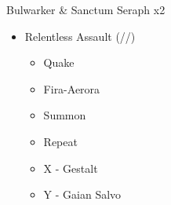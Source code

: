 \renewcommand{\second}{[2] Relentless Assault (\rav/\rav/\com)}

\begin{battle}[0:14]{Bulwarker \& Sanctum Seraph x2}
	\begin{itemize}
		\item \second
		      \begin{itemize}
			      \item Quake
			      \item Fira-Aerora
			      \item Summon
			      \item Repeat
			      \item X - Gestalt
			      \item Y - Gaian Salvo
		      \end{itemize}
	\end{itemize}
\end{battle}
\vfill
